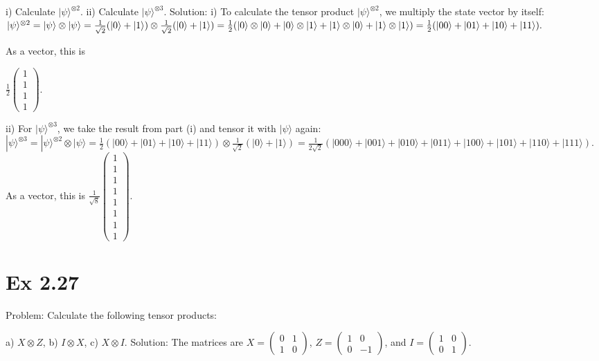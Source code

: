 \documentclass{article}
\newcommand{\0}{{$|0\rangle$}}
\newcommand{\1}{{$|1\rangle$}}
\begin{document}
i) Calculate $ |\psi \rangle^{\otimes 2} $.   
ii) Calculate $ |\psi \rangle^{\otimes 3} $.  
Solution:  
i) To calculate the tensor product $ |\psi \rangle^{\otimes 2} $, we multiply the state vector by itself:  
$
|\psi \rangle^{\otimes 2} = |\psi \rangle \otimes |\psi \rangle \\
= \frac{1}{\sqrt{2}} (|0 \rangle + |1 \rangle) \otimes \frac{1}{\sqrt{2}} (|0 \rangle + |1 \rangle) \\
= \frac{1}{2} (|0 \rangle \otimes |0 \rangle + |0 \rangle \otimes |1 \rangle + |1 \rangle \otimes |0 \rangle + |1 \rangle \otimes |1 \rangle) \\
= \frac{1}{2} (|00 \rangle + |01 \rangle + |10 \rangle + |11 \rangle).
$

As a vector, this is  

$ \frac{1}{2} \begin{pmatrix} 1 \\ 1 \\ 1 \\ 1 \end{pmatrix} $.  

ii) For $ |\psi \rangle^{\otimes 3} $, we take the result from part (i) and tensor it with $ |\psi \rangle $ again:  
$
|\psi \rangle^{\otimes 3} = |\psi \rangle^{\otimes 2} \otimes |\psi \rangle = \frac{1}{2} (|00 \rangle + |01 \rangle + |10 \rangle + |11 \rangle) \otimes \frac{1}{\sqrt{2}} (|0 \rangle + |1 \rangle) = \frac{1}{2\sqrt{2}} (|000 \rangle + |001 \rangle + |010 \rangle + |011 \rangle + |100 \rangle + |101 \rangle + |110 \rangle + |111 \rangle).
$
As a vector, this is  
$ \frac{1}{\sqrt{8}} \begin{pmatrix} 1 \\ 1 \\ 1 \\ 1 \\ 1 \\ 1 \\ 1 \\ 1 \end{pmatrix} $.

\newpage
\section*{Ex 2.27  }
Problem: Calculate the following tensor products:  

a) $ X \otimes Z $, b) $ I \otimes X $, c) $ X \otimes I $.  
Solution: The matrices are  
$ X = \begin{pmatrix} 0 & 1 \\ 1 & 0 \end{pmatrix} $,  
$ Z = \begin{pmatrix} 1 & 0 \\ 0 & -1 \end{pmatrix} $, and  
$ I = \begin{pmatrix} 1 & 0 \\ 0 & 1 \end{pmatrix} $.  
\end{document}
